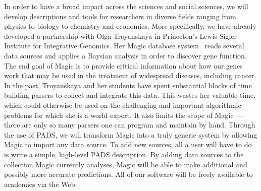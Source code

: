 \documentclass[10pt]{article}
\begin{document}
In order to have a broad impact across the sciences and social sciences,
we will develop descriptions and tools for researchers in diverse fields ranging from
physics to biology to chemistry and economics.
More specifically, we have already developed a partnership with
Olga Troyanskaya in Princeton's Lewis-Sigler Institute for 
Integrative Genomics.  Her Magic database system~\cite{magic}
reads several data sources
and applies a Baysian analysis in order to discover gene function.
The end goal of Magic is to provide critical information about how
our genes work that may be used in the treatment of widespread diseases,
including cancer.
In the past, Troyanskaya and her students have spent
substantial blocks of time building parsers to collect and integrate
this data.  This wastes her valuable time, which could otherwise be
used on the challenging and important algorithmic problems for which
she is a world expert.  It also limits the scope of Magic --- there are
only so many parsers one can program and maintain by hand.
Through the use of PADS, we will transform Magic into a truly generic
system by allowing Magic to import any data source.  To add new sources,
all a user will have to do is write a simple, high-level PADS description.
By adding data sources to the collection Magic
currently analyses, Magic will be able to make additional and possibly more
accurate predictions.  All of our software will
be freely available to academics via the Web.


\end{document}
